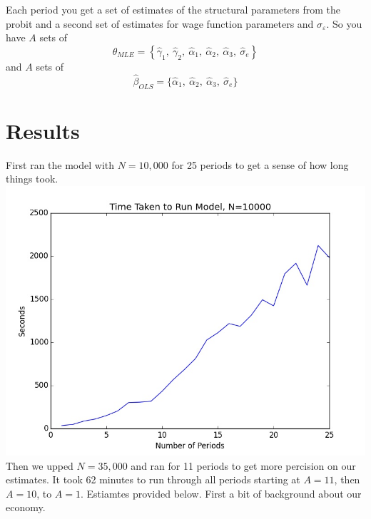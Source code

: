 \documentclass[11pt,letterpaper]{article}
\begin{document}
Each period you get a set of estimates of the structural parameters from the probit and a second set of estimates for wage function parameters and $\sigma_\varepsilon$. So you have $A$ sets of \[ \widehat \theta_{MLE} = \left\{\widehat\gamma_1, \ \widehat\gamma_2, \ \widehat\alpha_1, \ \widehat\alpha_2, \ \widehat\alpha_3, \ \widehat\sigma_e \right\}\] and $A$ sets of \[\widehat\beta_{OLS} = \{ \widehat\alpha_1, \ \widehat\alpha_2, \ \widehat\alpha_3, \ \widehat\sigma_e \}\]

\section{Results}

First ran the model with $N = 10,000$ for 25 periods to get a sense of how long things took.
		{
		\centering
		\includegraphics[width=.9\textwidth]{time_taken_keep.jpg} \\
		}
Then we upped $N=35,000$ and ran for 11 periods to get more percision on our estimates. It took 62 minutes to run through all periods starting at $A=11$, then $A=10$, to $A=1$. Estiamtes provided below. First a bit of background about our economy.

 
\end{document}

